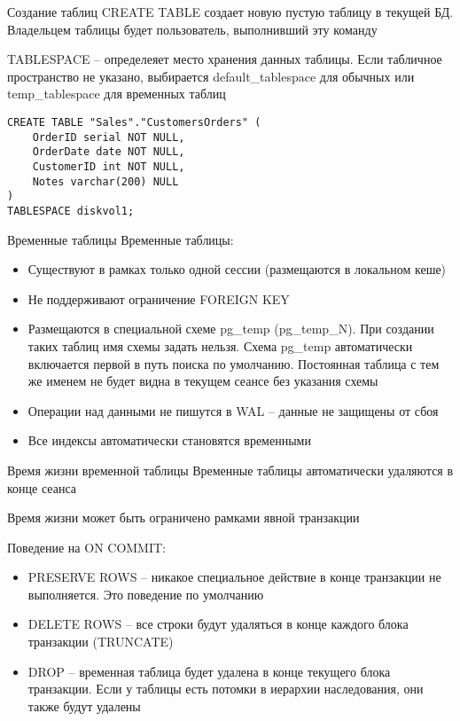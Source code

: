 \documentclass[12pt]{article}
\begin{document}
\begin{nota}{Создание таблиц}
    CREATE TABLE создает новую пустую таблицу в текущей БД. Владельцем таблицы будет пользователь, выполнивший эту команду 

    TABLESPACE -- определеяет место хранения данных таблицы. Если табличное пространство не указано, выбирается default\_tablespace для обычных или temp\_tablespace для временных таблиц
\end{nota}

\begin{Example}{}
\begin{lstlisting}
CREATE TABLE "Sales"."CustomersOrders" (
    OrderID serial NOT NULL,
    OrderDate date NOT NULL,
    CustomerID int NOT NULL,
    Notes varchar(200) NULL
)
TABLESPACE diskvol1;
\end{lstlisting}
\end{Example}

\begin{nota}{Временные таблицы}
    Временные таблицы: 

    \begin{itemize}
        \item Существуют в рамках только одной сессии (размещаются в локальном кеше)
        \item Не поддерживают ограничение FOREIGN KEY 
        \item Размещаются в специальной схеме pg\_temp (pg\_temp\_N). При создании таких таблиц имя схемы задать нельзя. Схема pg\_temp автоматически включается первой в путь поиска по умолчанию. Постоянная таблица с тем же именем не будет видна в текущем сеансе без указания схемы 
        \item Операции над данными не пишутся в WAL -- данные не защищены от сбоя 
        \item Все индексы автоматически становятся временными 
    \end{itemize}
\end{nota}

\begin{nota}{Время жизни временной таблицы}
    Временные таблицы автоматически удаляются в конце сеанса 

    Время жизни может быть ограничено рамками явной транзакции 

    Поведение на ON COMMIT:

    \begin{itemize}
        \item PRESERVE ROWS -- никакое специальное действие в конце транзакции не выполняется. Это поведение по умолчанию 
        \item DELETE ROWS -- все строки будут удаляться в конце каждого блока транзакции (TRUNCATE)
        \item DROP -- временная таблица будет удалена в конце текущего блока транзакции. Если у таблицы есть потомки в иерархии наследования, они также будут удалены 
    \end{itemize}
\end{nota}
\end{document}
